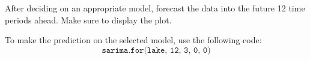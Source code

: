 After deciding on an appropriate model, forecast the data into the future 12 time periods ahead. Make sure to display the plot.

To make the prediction on the selected model, use the following code:
$$\texttt{sarima.for(lake, 12, 3, 0, 0)}$$
